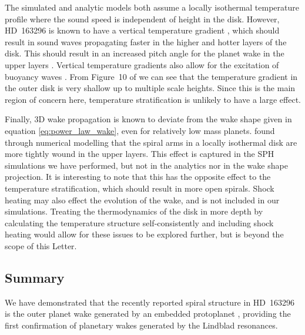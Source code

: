 The simulated and analytic models both assume a locally isothermal temperature profile where the sound speed is independent of height in the disk.
However, HD~163296 is known to have a vertical temperature gradient \citep{rosenfeld2013,degregorio-monsalvo2013}, which should result in sound waves propagating faster in the higher and hotter layers of the disk.
This should result in an increased pitch angle for the planet wake in the upper layers \citep{juhasz2018}.
Vertical temperature gradients also allow for the excitation of buoyancy waves \citep{bae2021}.
From Figure~10 of \citet{law2021} we can see that the temperature gradient in the outer disk is very shallow up to multiple scale heights. 
Since this is the main region of concern here, temperature stratification is unlikely to have a large effect.

Finally, 3D wake propagation is known to deviate from the wake shape given in equation \ref{eq:power_law_wake}, even for relatively low mass planets.
\citet{zhu2015} found through numerical modelling that the spiral arms in a locally isothermal disk are more tightly wound in the upper layers.
This effect is captured in the SPH simulations we have performed, but not in the analytics nor in the wake shape projection.
It is interesting to note that this has the opposite effect to the temperature stratification, which should result in more open spirals.
Shock heating may also effect the evolution of the wake, and is not included in our simulations.
Treating the thermodynamics of the disk in more depth by calculating the temperature structure self-consistently and including shock heating would allow for these issues to be explored further, but is beyond the scope of this Letter.

\subsection{Summary}

We have demonstrated that the recently reported spiral structure in HD~163296 \citep{teague2021} is the outer planet wake generated by an embedded protoplanet \citep{pinte2018a}, providing the first confirmation of planetary wakes generated by the Lindblad resonances.






